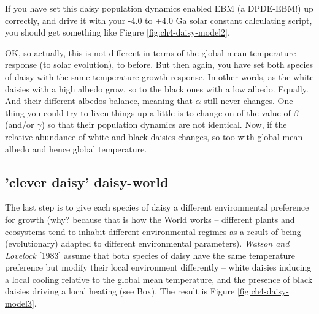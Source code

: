 \documentclass{tufte-book} %
\begin{document}
If you have set this daisy population dynamics enabled EBM (a DPDE-EBM!) up correctly, and drive it with your -4.0 to +4.0 Ga solar constant calculating script, you should get something like Figure \ref{fig:ch4-daisy-model2}.

OK, so actually, this is not different in terms of the global mean temperature response (to solar evolution), to before. But then again, you have set both species of daisy with the same temperature growth response. In other words, as the white daisies with a high albedo grow, so to the black ones with a low albedo. Equally. And their different albedos balance, meaning that \(\alpha\) still never changes. One thing you could try to liven things up a little is to change on of the value of \(\beta\) (and/or \(\gamma\)) so that their population dynamics are not identical. Now, if the relative abundance of white and black daisies changes, so too with global mean albedo and hence global temperature.


\subsection{'clever daisy' daisy-world}

The last step is to give each species of daisy a different environmental preference for growth (why? because that is how the World works -- different plants and ecosystems tend to inhabit different environmental regimes as a result of being (evolutionary) adapted to different environmental parameters). \textit{Watson and Lovelock} [1983] assume that both species of daisy have the same temperature preference but modify their local environment differently -- white daisies inducing a local cooling relative to the global mean temperature, and the presence of black daisies driving a local heating (see Box). The result is Figure \ref{fig:ch4-daisy-model3}.
\end{document}
